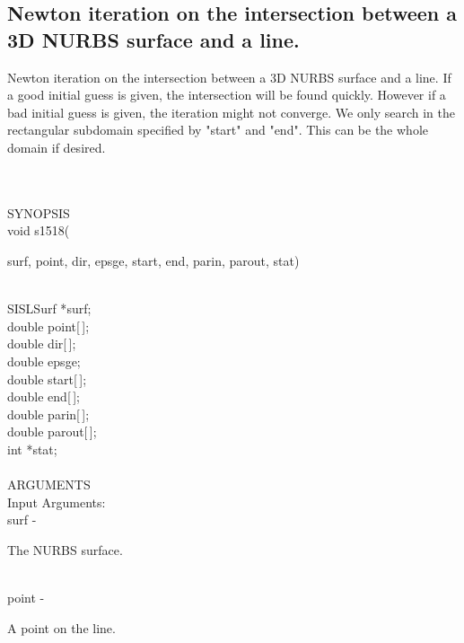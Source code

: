 \subsection{Newton iteration on the intersection between a 3D NURBS surface and a line.}
\begin{minipg1}
Newton iteration on the intersection between
               a 3D NURBS surface and a line.
               If a good initial guess is given, the intersection will
               be found quickly. However if a bad initial guess is given,
               the iteration might not converge.
               We only search in the rectangular subdomain specified
               by "start" and "end". This can be the whole domain if desired.
\end{minipg1} \\ \\
SYNOPSIS\\
        \>     void s1518(\begin{minipg3}
            {\fov surf},  {\fov point},  {\fov dir},  {\fov epsge},  {\fov start},  {\fov end},  {\fov parin},  {\fov parout},  {\fov stat})
                \end{minipg3}\\
                \>\>    SISLSurf    \>  *{\fov surf};\\
                \>\>    double \> point[\,];\\
                \>\>    double \> dir[\,];\\
                \>\>    double \> epsge;\\
                \>\>    double \> start[\,];\\
                \>\>    double \> end[\,];\\
                \>\>    double \> parin[\,];\\
                \>\>    double \> parout[\,];\\
                \>\>    int    \>  *{\fov stat};\\
\\
ARGUMENTS\\
	\>Input Arguments:\\
        \>\>    {\fov surf}\> - \>  \begin{minipg2}
                     The NURBS surface.
                               \end{minipg2}\\
        \>\>    {\fov point}\> - \>  \begin{minipg2}
                     A point on the line.
                               \end{minipg2}\\
